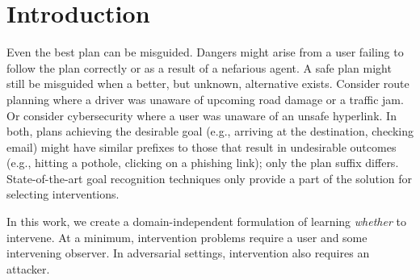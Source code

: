 \documentclass[letterpaper]{article}
\theoremstyle{plain}
\begin{document}
\section{Introduction}\label{sec:intro}
Even the best plan can be misguided.
Dangers might arise from a user failing to follow the plan correctly or as a result of a nefarious agent.
A safe plan might still be misguided when a better, but unknown, alternative exists.
Consider route planning where a driver was unaware of upcoming road damage or a traffic jam.  
Or consider cybersecurity where a user was unaware of an unsafe hyperlink.
In both, plans achieving the desirable goal (e.g., arriving at the destination, checking email) might have similar prefixes to those that result in undesirable outcomes (e.g., hitting a pothole, clicking on a phishing link); only the plan suffix differs.
State-of-the-art goal recognition techniques only provide a part of the solution for selecting interventions.

In this work, we create a domain-independent formulation of learning \emph{whether} to intervene.
At a minimum, intervention problems require a user and some intervening observer.
In adversarial settings, intervention also requires an attacker.
\end{document}

